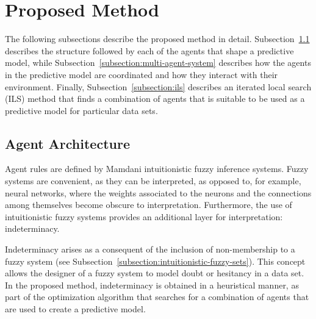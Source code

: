 \documentclass{ieeeaccess}
\begin{document}

\section{Proposed Method}
\label{section:proposed-method}


The following subsections describe the proposed method in
detail. Subsection~\ref{subsection:agent-architecture} describes the structure
followed by each of the agents that shape a predictive model, while
Subsection~\ref{subsection:multi-agent-system} describes how the agents in the
predictive model are coordinated and how they interact with their
environment. Finally, Subsection~\ref{subsection:ils} describes an
iterated local search (ILS) method that finds a combination of agents that is suitable to be used
as a predictive model for particular data sets.

\subsection{Agent Architecture}
\label{subsection:agent-architecture}

Agent rules are defined by Mamdani intuitionistic fuzzy inference systems. Fuzzy systems
are convenient, as they can be interpreted, as opposed to, for example, neural
networks, where the weights associated to the neurons and the connections among
themselves become obscure to interpretation. Furthermore, the use of
intuitionistic fuzzy systems provides an additional layer for interpretation:
indeterminacy.

Indeterminacy arises as a consequent of the inclusion of non-membership to a %
fuzzy system (see Subsection~\ref{subsection:intuitionistic-fuzzy-sets}). This
concept allows the designer of a fuzzy system to model doubt or hesitancy in a
data set. In the proposed method, indeterminacy is obtained in a heuristical
manner, as part of the optimization algorithm that searches for a combination of
agents that are used to create a predictive model.
\end{document}
